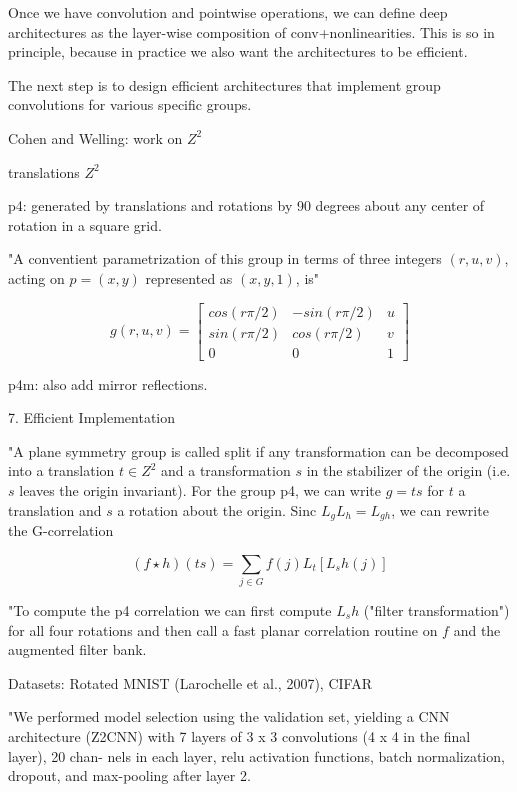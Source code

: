 \documentclass[english]{article}
\begin{document}
\item 
Once we have convolution and pointwise operations, we can define deep architectures as the layer-wise composition of conv+nonlinearities. This is so in principle, because in practice we also want the architectures to be efficient.

The next step is to design efficient architectures that implement group convolutions for various specific groups. 


\item Cohen and Welling: work on $Z^2$

\benum 
\item
translations $Z^2$
\item

p4: generated by translations and rotations by 90 degrees about any center of rotation in a square grid. 

"A conventient parametrization of this group in terms of three integers $(r,u,v)$, acting on $p=(x,y)$ represented as $(x,y,1)$, is"

$$
g(r,u,v)
= \begin{bmatrix} 
cos(r\pi/2) &-sin(r\pi/2) & u \\ 
sin(r\pi/2) & cos(r\pi/2)& v \\ 
0 &0 &1 
\end{bmatrix}
$$
\item p4m: also add mirror reflections. 

\eenum 

\item 7. Efficient Implementation

"A plane symmetry group is called split if any transformation can be decomposed into a translation $t \in Z^2$ and a transformation $s$ in the stabilizer of the origin (i.e. $s$ leaves the origin invariant). For the group p4, we can write $g = ts$ for $t$ a translation and $s$ a rotation about the origin. Sinc $L_g L_h = L_{gh}$, we can rewrite the G-correlation 

$$(f \star h)(ts) = \sum_{j\in G} f(j)L_t [L_sh(j)]$$

"To compute the p4  correlation we can
first compute $L_s h$ ("filter transformation") for all four rotations and then call a fast planar correlation routine on $f$ and the augmented filter bank.

\item Datasets: Rotated MNIST (Larochelle et al., 2007), CIFAR

"We performed model selection using the validation set,
yielding a CNN architecture (Z2CNN) with 7 layers of
3 x 3 convolutions (4 x 4 in the final layer), 20 chan-
nels in each layer, relu activation functions, batch normalization, dropout, and max-pooling after layer 2.
\end{document}
